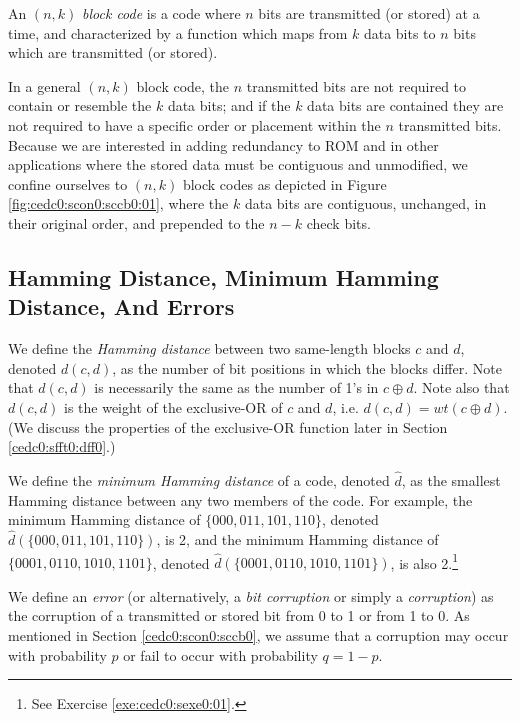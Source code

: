 An
%
$(n,k)$ \emph{block code} is a code where $n$ bits are transmitted (or stored) at a
time, and characterized by a function which maps from $k$ data bits to $n$ bits which
are transmitted (or stored).

In a general $(n,k)$ block code, the $n$ transmitted
bits are not required to contain or resemble the $k$ data bits; and if the $k$ data bits
are contained they are not required to have a specific order or placement within 
the $n$ transmitted bits.  Because we are interested in adding 
redundancy to ROM and in other applications
where the stored data must be contiguous and unmodified, we confine ourselves
to $(n,k)$ block codes as depicted in Figure
\ref{fig:cedc0:scon0:sccb0:01}, where the $k$ data bits are contiguous, unchanged,
in their original order, and prepended to the $n-k$ check bits.


\subsection{Hamming Distance, Minimum Hamming Distance, And Errors}
\label{cedc0:scon0:smhd0}

We define the \emph{Hamming distance} between 
two same-length blocks $c$ and $d$, denoted $d(c,d)$, as the number of bit positions
in which the blocks differ.  Note that $d(c,d)$ is necessarily the same as the number
of 1's in $c \oplus d$.  Note also that $d(c,d)$ is the weight of the 
exclusive-OR of $c$ and $d$, i.e. $d(c,d) = wt(c \oplus d)$.  (We discuss the properties 
of the exclusive-OR function later in Section \ref{cedc0:sfft0:dff0}.)

We define the \emph{minimum Hamming distance}
of a code, denoted $\hat{d}$, as the smallest Hamming distance between any two 
members of the code.  For example, the minimum Hamming distance of
$\{000, 011, 101, 110\}$,
denoted $\hat{d}(\{000, 011, 101, 110\})$,
 is 2, and the minimum Hamming distance of
$\{0001, 0110, 1010, 1101\}$,
denoted $\hat{d}(\{0001, 0110, 1010, 1101\})$,
 is also 2.\footnote{See Exercise 
\ref{exe:cedc0:sexe0:01}.}

We define an \emph{error} (or alternatively, a 
\emph{bit corruption} or simply a \emph{corruption}) as the corruption
of a transmitted or stored
bit from 0 to 1 or from 1 to 0.  As mentioned in
Section \ref{cedc0:scon0:sccb0}, we assume that a corruption may occur
with probability $p$ or fail to occur with probability $q=1-p$.

